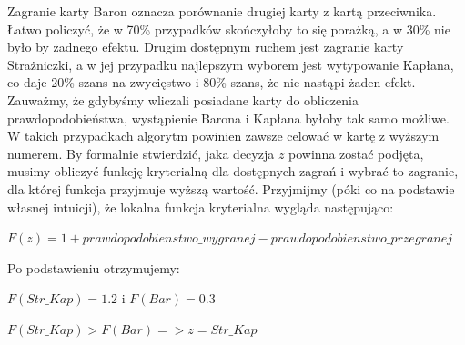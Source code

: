 Zagranie karty Baron oznacza porównanie drugiej karty z kartą przeciwnika. Łatwo policzyć, że w 70\% przypadków skończyłoby to się porażką, a w 30\% nie było by żadnego efektu. Drugim dostępnym ruchem jest zagranie karty Strażniczki, a w jej przypadku najlepszym wyborem jest wytypowanie Kapłana, co daje 20\% szans na zwycięstwo i 80\% szans, że nie nastąpi żaden efekt. Zauważmy, że gdybyśmy wliczali posiadane karty do obliczenia prawdopodobieństwa, wystąpienie Barona i Kapłana byłoby tak samo możliwe. W takich przypadkach algorytm powinien zawsze celować w kartę z wyższym numerem. By formalnie stwierdzić, jaka decyzja $z$ powinna zostać podjęta, musimy obliczyć funkcję kryterialną dla dostępnych zagrań i wybrać to zagranie, dla której funkcja przyjmuje wyższą wartość. Przyjmijmy (póki co na podstawie własnej intuicji), że lokalna funkcja kryterialna wygląda następująco:

\begin{center}
	$F(z) = 1 + prawdopodobienstwo\_wygranej - prawdopodobienstwo\_przegranej$
\end{center}
Po podstawieniu otrzymujemy:
\begin{center}
 $F(Str\_Kap)=1.2$ i $F(Bar) = 0.3$
 
 $F(Str\_Kap)>F(Bar) => z = Str\_Kap$ 
\end{center} 

